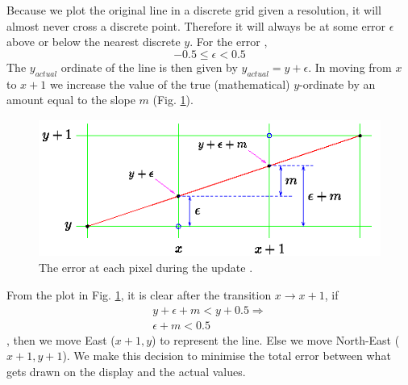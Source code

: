 \documentclass[a4paper]{article}
\begin{document}
Because we plot the original line in a discrete grid given a resolution, it will almost never cross a discrete point. Therefore it will always be at some error $\epsilon$ above or below the nearest discrete $y$. For the error \cite{mallinus},
\begin{equation}
	-0.5 \leq \epsilon <0.5
\end{equation}
The $y_{actual}$ ordinate of the line is then given by $y_{actual} = y+\epsilon$. In moving from $x$ to $x+1$ we increase the value of the true (mathematical) $y$-ordinate by an amount equal to the slope $m$ (Fig. \ref{fig:error_diagram}).
\begin{figure}[H]
	\centering
	\includegraphics[height=4.5cm]{img/error_diagram.png}
	\caption{The error at each pixel during the update \cite{mallinus}.}
	\label{fig:error_diagram}
\end{figure}
From the plot in Fig. \ref{fig:error_diagram}, it is clear after the transition $x\rightarrow x+1$, if 
\begin{gather*}
	y + \epsilon + m < y+  0.5 \Rightarrow\\
	\epsilon + m < 0.5
\end{gather*}
, then we move East ($x+1,y$) to represent the line. Else we move North-East ($x+1,y+1$). We make this decision to minimise the total error between what gets drawn on the display and the actual values.
\end{document}

